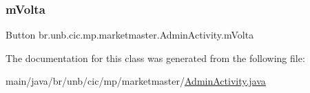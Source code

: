 \subsubsection{\texorpdfstring{m\+Volta}{mVolta}}
{\footnotesize\ttfamily Button br.\+unb.\+cic.\+mp.\+marketmaster.\+Admin\+Activity.\+m\+Volta\hspace{0.3cm}{\ttfamily [private]}}



The documentation for this class was generated from the following file\+:\begin{DoxyCompactItemize}
\item 
main/java/br/unb/cic/mp/marketmaster/\mbox{\hyperlink{AdminActivity_8java}{Admin\+Activity.\+java}}\end{DoxyCompactItemize}
